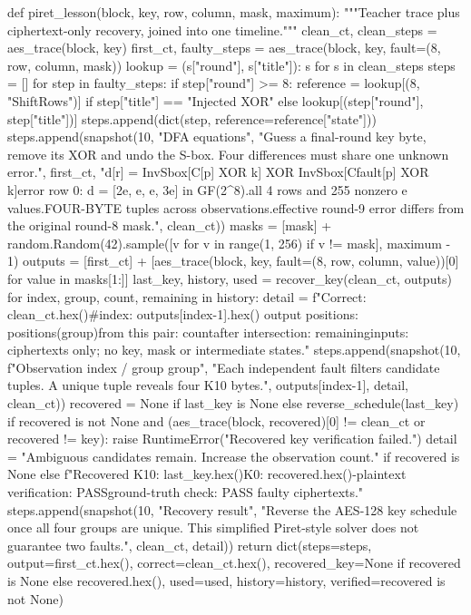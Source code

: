 \begin{lightcode}[numbers=left,firstnumber=1]
def piret_lesson(block, key, row, column, mask, maximum):
    """Teacher trace plus ciphertext-only recovery, joined into one timeline."""
    clean_ct, clean_steps = aes_trace(block, key)
    first_ct, faulty_steps = aes_trace(block, key, fault=(8, row, column, mask))
    lookup = {(s["round"], s["title"]): s for s in clean_steps}
    steps = []
    for step in faulty_steps:
        if step["round"] >= 8:
            reference = lookup[(8, "ShiftRows")] if step["title"] == "Injected XOR" else lookup[(step["round"], step["title"])]
            steps.append(dict(step, reference=reference["state"]))
    steps.append(snapshot(10, "DFA equations", "Guess a final-round key byte, remove its XOR and undo the S-box. Four differences must share one unknown error.", first_ct, "d[r] = InvSbox[C[p] XOR k] XOR InvSbox[Cfault[p] XOR k]\nFor error row 0: d = [2e, e, e, 3e] in GF(2^8).\nTry all 4 rows and 255 nonzero e values.\nIntersect FOUR-BYTE tuples across observations.\nThe effective round-9 error differs from the original round-8 mask.", clean_ct))
    masks = [mask] + random.Random(42).sample([v for v in range(1, 256) if v != mask], maximum - 1)
    outputs = [first_ct] + [aes_trace(block, key, fault=(8, row, column, value))[0] for value in masks[1:]]
    last_key, history, used = recover_key(clean_ct, outputs)
    for index, group, count, remaining in history:
        detail = f"Correct: {clean_ct.hex()}\nFaulty #{index}: {outputs[index-1].hex()} output positions: {positions(group)}\nCandidates from this pair: {count}\nCandidates after intersection: {remaining}\nSolver inputs: ciphertexts only; no key, mask or intermediate states."
        steps.append(snapshot(10, f"Observation {index} / group {group}", "Each independent fault filters candidate tuples. A unique tuple reveals four K10 bytes.", outputs[index-1], detail, clean_ct))
    recovered = None if last_key is None else reverse_schedule(last_key)
    if recovered is not None and (aes_trace(block, recovered)[0] != clean_ct or recovered != key):
        raise RuntimeError("Recovered key verification failed.")
    detail = "Ambiguous candidates remain. Increase the observation count." if recovered is None else f"Recovered K10: {last_key.hex()}\nRecovered K0:  {recovered.hex()}\nKnown-plaintext verification: PASS\nSimulation ground-truth check: PASS faulty ciphertexts."
    steps.append(snapshot(10, "Recovery result", "Reverse the AES-128 key schedule once all four groups are unique. This simplified Piret-style solver does not guarantee two faults.", clean_ct, detail))
    return dict(steps=steps, output=first_ct.hex(), correct=clean_ct.hex(), recovered_key=None if recovered is None else recovered.hex(), used=used, history=history, verified=recovered is not None)



\end{lightcode}
